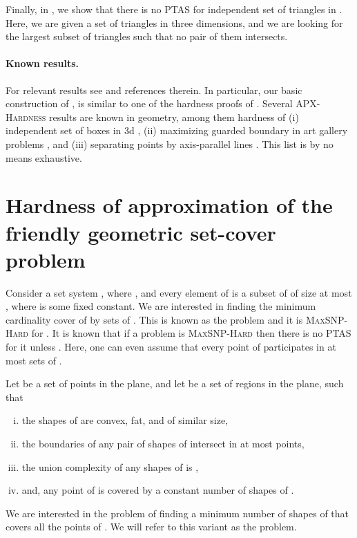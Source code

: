 \documentclass[12pt]{article}
\providecommand{\ComplexityClass}[1]{{{\textcolor[named]{\si{OliveGreen}}{\textsc{#1}}}}}
\providecommand{\APXHardness}{{\ComplexityClass{\si{APX}-Hardness}}\xspace}
\providecommand{\MaxSNPHard}{{\ComplexityClass{Max{S}NP-Hard}}\xspace}
\providecommand{\PTAS}{\textsf{\si{PTAS}}\xspace}
\begin{document}
Finally, in , we show that there is no \PTAS for
independent set of triangles in . Here, we are given a set of
triangles in three dimensions, and we are looking for the largest
subset of triangles such that no pair of them intersects.

\paragraph{Known results.}
For relevant results see \cite{aes-ssena-09, cch-smcpg-09,
   mr-irghsp-09} and references therein. In particular, our basic
construction of , is similar to one of the hardness
proofs of \cite{el-dgig-08}. Several \APXHardness results are known in
geometry, among them hardness of (i) independent set of boxes in 3d
\cite{cc-ahopi-05}, (ii) maximizing guarded boundary in art gallery
problems \cite{fmz-mgbag-07}, and (iii) separating points by
axis-parallel lines \cite{cdkw-spapl-05}. This list is by no means
exhaustive.




\section{Hardness of approximation of the friendly
   geometric set-cover problem}

Consider a set system , where , and
every element of  is a subset of  of size at most ,
where  is some fixed constant. We are interested in finding the
minimum cardinality cover of  by sets of . This is known
as the  problem and it is \MaxSNPHard for
 \cite{acgkm-ca-99}. It is known that if a problem is
\MaxSNPHard then there is no \PTAS for it unless . Here,
one can even assume that every point of  participates in at most
 sets of .

\begin{defn}
    Let  be a set of  points in the plane, and let
     be a set of  regions in the plane, such that 
    \begin{enumerate}[(i)]
        \item the shapes of  are convex, fat, and of similar
        size,

        \item the boundaries of any pair of shapes of 
        intersect in at most  points,

        \item the union complexity of any  shapes of  is
        ,

        \item and, any point of  is covered by a constant number
        of shapes of .
    \end{enumerate}
    We are interested in the problem of finding a minimum number of
    shapes of  that covers all the points of . We
    will refer to this variant as the  problem.
\end{defn}
\end{document}
